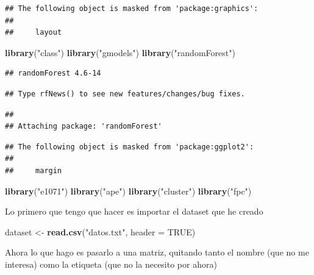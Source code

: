 \documentclass[]{article}
\newenvironment{Shaded}{\begin{snugshade}}{\end{snugshade}}
\newcommand{\KeywordTok}[1]{\textcolor[rgb]{0.13,0.29,0.53}{\textbf{#1}}}
\newcommand{\DataTypeTok}[1]{\textcolor[rgb]{0.13,0.29,0.53}{#1}}
\newcommand{\StringTok}[1]{\textcolor[rgb]{0.31,0.60,0.02}{#1}}
\newcommand{\OtherTok}[1]{\textcolor[rgb]{0.56,0.35,0.01}{#1}}
\newcommand{\NormalTok}[1]{#1}
\begin{document}
\begin{verbatim}
## The following object is masked from 'package:graphics':
## 
##     layout
\end{verbatim}

\begin{Shaded}
\begin{Highlighting}[]
\KeywordTok{library}\NormalTok{(}\StringTok{"class"}\NormalTok{)}
\KeywordTok{library}\NormalTok{(}\StringTok{"gmodels"}\NormalTok{)}
\KeywordTok{library}\NormalTok{(}\StringTok{"randomForest"}\NormalTok{)}
\end{Highlighting}
\end{Shaded}

\begin{verbatim}
## randomForest 4.6-14
\end{verbatim}

\begin{verbatim}
## Type rfNews() to see new features/changes/bug fixes.
\end{verbatim}

\begin{verbatim}
## 
## Attaching package: 'randomForest'
\end{verbatim}

\begin{verbatim}
## The following object is masked from 'package:ggplot2':
## 
##     margin
\end{verbatim}

\begin{Shaded}
\begin{Highlighting}[]
\KeywordTok{library}\NormalTok{(}\StringTok{"e1071"}\NormalTok{)}
\KeywordTok{library}\NormalTok{(}\StringTok{"ape"}\NormalTok{)}
\KeywordTok{library}\NormalTok{(}\StringTok{"cluster"}\NormalTok{)}
\KeywordTok{library}\NormalTok{(}\StringTok{"fpc"}\NormalTok{)}
\end{Highlighting}
\end{Shaded}

Lo primero que tengo que hacer es importar el dataset que he creado

\begin{Shaded}
\begin{Highlighting}[]
\NormalTok{dataset <-}\StringTok{ }\KeywordTok{read.csv}\NormalTok{(}\StringTok{"datos.txt"}\NormalTok{, }\DataTypeTok{header =} \OtherTok{TRUE}\NormalTok{)}
\end{Highlighting}
\end{Shaded}

Ahora lo que hago es pasarlo a una matriz, quitando tanto el nombre (que
no me interesa) como la etiqueta (que no la necesito por ahora)
\end{document}
